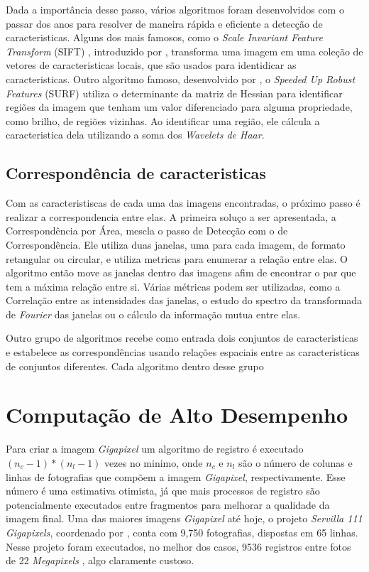     Dada a importância desse passo, vários algoritmos foram desenvolvidos com o passar dos anos para resolver de maneira
rápida e eficiente a detecção de caracteristicas. Alguns dos mais famosos, como o 
\textit{Scale Invariant Feature Transform} (SIFT) , introduzido por \cite{lowe1999object}, transforma uma imagem em uma 
coleção de vetores de caracteristicas locais, que são usados para identidicar as caracteristicas. Outro algoritmo famoso,
desenvolvido por \cite{bay2006surf}, o \textit{Speeded Up Robust Features} (SURF) utiliza o determinante da matriz de
Hessian para identificar regiões da imagem que tenham um valor diferenciado para alguma propriedade, como brilho, de 
regiões vizinhas. Ao identificar uma região, ele cálcula a caracteristica dela utilizando a soma dos 
\textit{Wavelets de Haar}.

\subsection{Correspondência de caracteristicas}

    Com as caracteristiscas de cada uma das imagens encontradas, o próximo passo é realizar a correspondencia entre elas.
A primeira soluço a ser apresentada, a Correspondência por Área, mescla o passo de Detecção com o de Correspondência. 
Ele utiliza duas janelas, uma para cada imagem, de formato retangular ou circular, e utiliza metricas para enumerar a 
relação entre elas. O algoritmo então move as janelas dentro das imagens afim de encontrar o par que tem a máxima
relação entre si. Várias métricas podem ser utilizadas, como a Correlação entre as intensidades das janelas, o estudo
do spectro da transformada de \textit{Fourier} das janelas ou o cálculo da informação mutua entre elas. 

 Outro grupo de algoritmos recebe como entrada dois conjuntos de caracteristicas e estabelece as correspondências
usando relações espaciais entre as caracteristicas de conjuntos diferentes. Cada algoritmo dentro desse grupo 


    
\section{Computação de Alto Desempenho}
    Para criar a imagem \textit{Gigapixel} um algoritmo de registro é executado $(n_c-1)*(n_l-1)$ vezes no minimo, 
onde $n_c$ e $n_l$ são o número de colunas e linhas de fotografias que compõem a imagem \textit{Gigapixel}, 
respectivamente. Esse número é uma estimativa otimista, já que mais processos de registro são potencialmente executados
entre fragmentos para melhorar a qualidade da imagem final. Uma das maiores imagens \textit{Gigapixel} até hoje, 
o projeto \textit{Servilla 111 Gigapixels}, coordenado por \cite{sevilla111},  conta com 9,750 fotografias, dispostas
em 65 linhas. Nesse projeto foram executados, no melhor dos casos, 9536 registros entre fotos de 22 \textit{Megapixels}
, algo claramente custoso.

